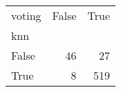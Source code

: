 \begin{tabular}{lrr}
\toprule
voting &  False &  True  \\
knn   &        &        \\
\midrule
False &     46 &     27 \\
True  &      8 &    519 \\
\bottomrule
\end{tabular}
